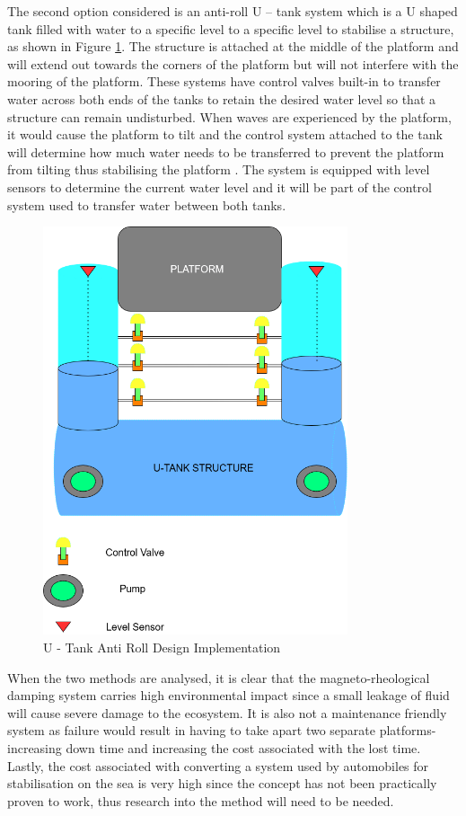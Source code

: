 \documentclass[11pt]{article}
\numberwithin{equation}{section}
\begin{document}
The second option considered is an anti-roll U – tank system which is a U shaped tank filled with water to a specific level to a specific level to stabilise a structure, as shown in Figure \ref{u_tank}. The structure is attached at the middle of the platform and will extend out towards the corners of the platform but will not interfere with the mooring of the platform. These systems have control valves built-in to transfer water across both ends of the tanks to retain the desired water level so that a structure can remain undisturbed. When waves are experienced by the platform, it would cause the platform to tilt and the control system attached to the tank will determine how much water needs to be transferred to prevent the platform from tilting thus stabilising the platform \cite{5s,6s}. The system is equipped with level sensors to determine the current water level and it will be part of the control system used to transfer water between both tanks.

\begin{figure}[H]
\centering
\includegraphics[width=0.8\textwidth]{Figures/u_tank.png}
\caption{\label{u_tank}U - Tank Anti Roll Design Implementation}
\end{figure}

When the two methods are analysed, it is clear that the magneto-rheological damping system carries high environmental impact since a small leakage of fluid will cause severe damage to the ecosystem. It is also not a maintenance friendly system as failure would result in having to take apart two separate platforms- increasing down time and increasing the cost associated with the lost time. Lastly, the cost associated with converting a system used by automobiles for stabilisation on the sea is very high since the concept has not been practically proven to work, thus research into the method will need to be needed.
\end{document}
